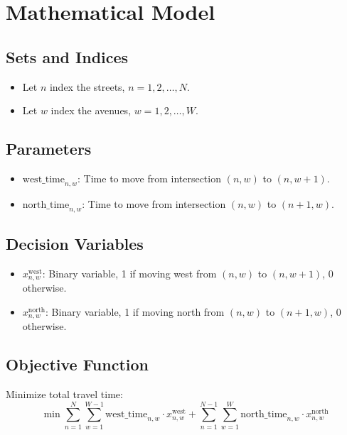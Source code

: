 \documentclass{article}
\begin{document}
\section*{Mathematical Model}

\subsection*{Sets and Indices}
\begin{itemize}
    \item Let \( n \) index the streets, \( n = 1, 2, \ldots, N \).
    \item Let \( w \) index the avenues, \( w = 1, 2, \ldots, W \).
\end{itemize}

\subsection*{Parameters}
\begin{itemize}
    \item \( \text{west\_time}_{n,w} \): Time to move from intersection \((n, w)\) to \((n, w+1)\).
    \item \( \text{north\_time}_{n,w} \): Time to move from intersection \((n, w)\) to \((n+1, w)\).
\end{itemize}

\subsection*{Decision Variables}
\begin{itemize}
    \item \( x_{n,w}^{\text{west}} \): Binary variable, 1 if moving west from \((n, w)\) to \((n, w+1)\), 0 otherwise.
    \item \( x_{n,w}^{\text{north}} \): Binary variable, 1 if moving north from \((n, w)\) to \((n+1, w)\), 0 otherwise.
\end{itemize}

\subsection*{Objective Function}
Minimize total travel time:
\[
\min \sum_{n=1}^{N} \sum_{w=1}^{W-1} \text{west\_time}_{n,w} \cdot x_{n,w}^{\text{west}} + \sum_{n=1}^{N-1} \sum_{w=1}^{W} \text{north\_time}_{n,w} \cdot x_{n,w}^{\text{north}}
\]
\end{document}
